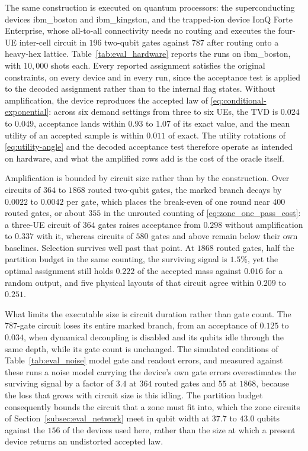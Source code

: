 The same construction is executed on quantum processors: the superconducting devices ibm\_boston and ibm\_kingston, and the trapped-ion device IonQ Forte Enterprise, whose all-to-all connectivity needs no routing and executes the four-UE inter-cell circuit in $196$ two-qubit gates against $787$ after routing onto a heavy-hex lattice. Table~\ref{tab:eval_hardware} reports the runs on ibm\_boston, with $10{,}000$ shots each. Every reported assignment satisfies the original constraints, on every device and in every run, since the acceptance test is applied to the decoded assignment rather than to the internal flag states. Without amplification, the device reproduces the accepted law of \eqref{eq:conditional-exponential}: across six demand settings from three to six UEs, the TVD is $0.024$ to $0.049$, acceptance lands within $0.93$ to $1.07$ of its exact value, and the mean utility of an accepted sample is within $0.011$ of exact. The utility rotations of \eqref{eq:utility-angle} and the decoded acceptance test therefore operate as intended on hardware, and what the amplified rows add is the cost of the oracle itself.

Amplification is bounded by circuit size rather than by the construction. Over circuits of $364$ to $1868$ routed two-qubit gates, the marked branch decays by $0.0022$ to $0.0042$ per gate, which places the break-even of one round near $400$ routed gates, or about $355$ in the unrouted counting of \eqref{eq:zone_one_pass_cost}: a three-UE circuit of $364$ gates raises acceptance from $0.298$ without amplification to $0.337$ with it, whereas circuits of $580$ gates and above remain below their own baselines. Selection survives well past that point. At $1868$ routed gates, half the partition budget in the same counting, the surviving signal is $1.5\%$, yet the optimal assignment still holds $0.222$ of the accepted mass against $0.016$ for a random output, and five physical layouts of that circuit agree within $0.209$ to $0.251$.

What limits the executable size is circuit duration rather than gate count. The $787$-gate circuit loses its entire marked branch, from an acceptance of $0.125$ to $0.034$, when dynamical decoupling is disabled and its qubits idle through the same depth, while its gate count is unchanged. The simulated conditions of Table~\ref{tab:eval_noise} model gate and readout errors, and measured against these runs a noise model carrying the device's own gate errors overestimates the surviving signal by a factor of $3.4$ at $364$ routed gates and $55$ at $1868$, because the loss that grows with circuit size is this idling. The partition budget consequently bounds the circuit that a zone must fit into, which the zone circuits of Section~\ref{subsec:eval_network} meet in qubit width at $37.7$ to $43.0$ qubits against the $156$ of the devices used here, rather than the size at which a present device returns an undistorted accepted law.

